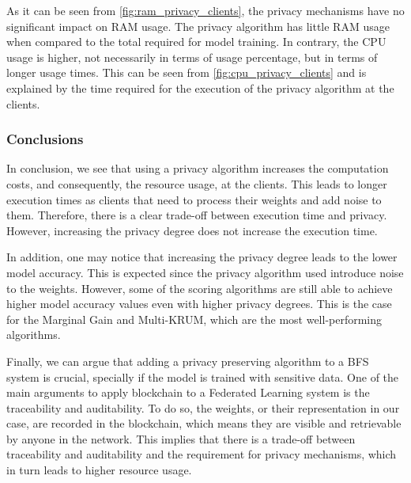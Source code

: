 As it can be seen from \autoref{fig:ram_privacy_clients}, the privacy mechanisms have no significant impact on RAM usage. The privacy algorithm has little RAM usage when compared to the total required for model training. In contrary, the CPU usage is higher, not necessarily in terms of usage percentage, but in terms of longer usage times. This can be seen from \autoref{fig:cpu_privacy_clients} and is explained by the time required for the execution of the privacy algorithm at the clients.

\subsubsection{Conclusions}

In conclusion, we see that using a privacy algorithm increases the computation costs, and consequently, the resource usage, at the clients. This leads to longer execution times as clients that need to process their weights and add noise to them. Therefore, there is a clear trade-off between execution time and privacy. However, increasing the privacy degree does not increase the execution time.

In addition, one may notice that increasing the privacy degree leads to the lower model accuracy. This is expected since the privacy algorithm used introduce noise to the weights. However, some of the scoring algorithms are still able to achieve higher model accuracy values even with higher privacy degrees. This is the case for the Marginal Gain and Multi-KRUM, which are the most well-performing algorithms.

Finally, we can argue that adding a privacy preserving algorithm to a BFS system is crucial, specially if the model is trained with sensitive data. One of the main arguments to apply blockchain to a Federated Learning system is the traceability and auditability. To do so, the weights, or their representation in our case, are recorded in the blockchain, which means they are visible and retrievable by anyone in the network. This implies that there is a trade-off between traceability and auditability and the requirement for privacy mechanisms, which in turn leads to higher resource usage.
